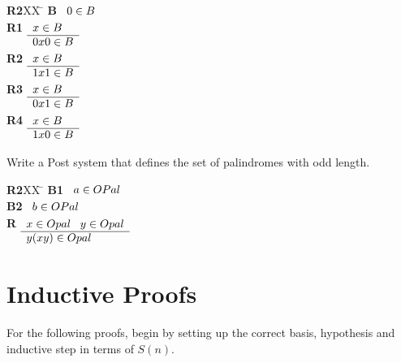 \documentclass[]{exam}
\theoremstyle{definition}
\begin{document}
\begin{questions}
\begin{tabbing}
{\bf R2}XX \=  \kill
{\bf B} \>
        \(\begin{array}[t]{l}
        0\in B
        \end{array}\) \\[2ex]
{\bf R1} \>
        \(\begin{array}[t]{l}
        x \in B \\
        \hline
        0x0 \in B
        \end{array}\) \\[2ex]
{\bf R2} \>
        \(\begin{array}[t]{l}
        x \in B \\
        \hline
        1x1 \in B
        \end{array}\) \\[2ex]
{\bf R3} \>
        \(\begin{array}[t]{l}
        x \in B \\
        \hline
        0x1 \in B
        \end{array}\) \\[2ex]
{\bf R4} \>
        \(\begin{array}[t]{l}
        x \in B \\
        \hline
        1x0 \in B
        \end{array}\)
\end{tabbing}

\question Write a Post system that defines the set of palindromes with odd
length.

\begin{tabbing}
{\bf R2}XX \=  \kill
{\bf B1} \>
        \(\begin{array}[t]{l}
        a \in OPal
        \end{array}\) \\[2ex]
{\bf B2} \>
        \(\begin{array}[t]{l}
        b \in OPal 
        \end{array}\) \\[2ex]
{\bf R} \>
        \(\begin{array}[t]{l}
        x \in Opal \;\;\;y \in Opal \\
        \hline
        y(xy) \in Opal
        \end{array}\)
\end{tabbing}


\section*{Inductive Proofs}
For the following proofs, begin by setting up the correct basis, hypothesis
and inductive step in terms of $S(n)$.


\end{questions}
\end{document}
